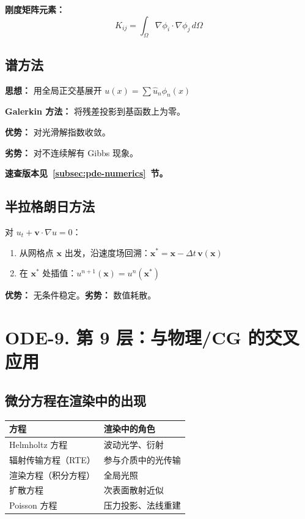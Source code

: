 \textbf{刚度矩阵元素：}
\[
K_{ij} = \int_\Omega \nabla\phi_i \cdot \nabla\phi_j\,d\Omega
\]

\subsection{谱方法}

\textbf{思想：} 用全局正交基展开 $u(x) = \sum \hat{u}_n \phi_n(x)$

\textbf{Galerkin 方法：} 将残差投影到基函数上为零。

\textbf{优势：} 对光滑解指数收敛。

\textbf{劣势：} 对不连续解有 Gibbs 现象。

\textbf{速查版本见~\ref{subsec:pde-numerics}~节。}

\subsection{半拉格朗日方法}

对 $u_t + \mathbf{v}\cdot\nabla u = 0$：
\begin{enumerate}
  \item 从网格点 $\mathbf{x}$ 出发，沿速度场回溯：$\mathbf{x}^* = \mathbf{x} - \Delta t\,\mathbf{v}(\mathbf{x})$
  \item 在 $\mathbf{x}^*$ 处插值：$u^{n+1}(\mathbf{x}) = u^n(\mathbf{x}^*)$
\end{enumerate}

\textbf{优势：} 无条件稳定。\textbf{劣势：} 数值耗散。

\section{ODE-9. 第 9 层：与物理/CG 的交叉应用}

\subsection{微分方程在渲染中的出现}

\begin{center}
\begin{tabular}{L{4cm}L{5cm}}
\toprule
\textbf{方程} & \textbf{渲染中的角色} \\
\midrule
Helmholtz 方程 & 波动光学、衍射 \\
辐射传输方程（RTE） & 参与介质中的光传输 \\
渲染方程（积分方程） & 全局光照 \\
扩散方程 & 次表面散射近似 \\
Poisson 方程 & 压力投影、法线重建 \\
\bottomrule
\end{tabular}
\end{center}

